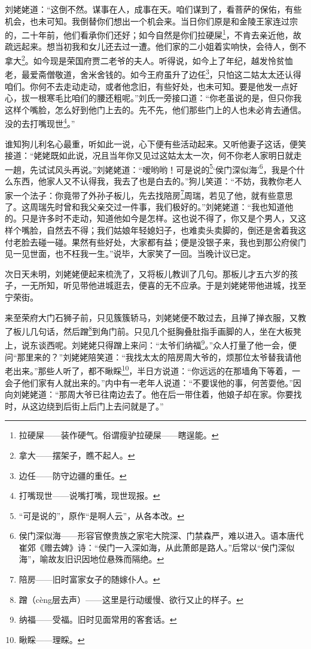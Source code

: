 \par 刘姥姥道：“这倒不然。谋事在人，成事在天。咱们谋到了，看菩萨的保佑，有些机会，也未可知。我倒替你们想出一个机会来。当日你们原是和金陵王家连过宗的，二十年前，他们看承你们还好；如今自然是你们拉硬屎\footnote{拉硬屎——装作硬气。俗谓瘦驴拉硬屎——瞎逞能。}，不肯去亲近他，故疏远起来。想当初我和女儿还去过一遭。他们家的二小姐着实响快，会待人，倒不拿大\footnote{拿大——摆架子，瞧不起人。}。如今现是荣国府贾二老爷的夫人。听得说，如今上了年纪，越发怜贫恤老，最爱斋僧敬道，舍米舍钱的。如今王府虽升了边任\footnote{边任——防守边疆的重任。}，只怕这二姑太太还认得咱们。你何不去走动走动，或者他念旧，有些好处，也未可知。要是他发一点好心，拔一根寒毛比咱们的腰还粗呢。”刘氏一旁接口道：“你老虽说的是，但只你我这样个嘴脸，怎么好到他门上去的。先不先，他们那些门上的人也未必肯去通信。没的去打嘴现世\footnote{打嘴现世——说嘴打嘴，现世现报。}。”
\par 谁知狗儿利名心最重，听如此一说，心下便有些活动起来。又听他妻子这话，便笑接道：“姥姥既如此说，况且当年你又见过这姑太太一次，何不你老人家明日就走一趟，先试试风头再说。”刘姥姥道：“嗳哟哟！可是说的\footnote{“可是说的”，原作“是啊人云”，从各本改。}‘侯门深似海’\footnote{侯门深似海——形容官僚贵族之家宅大院深、门禁森严，难以进入。语本唐代崔郊《赠去婢》诗：“侯门一入深如海，从此萧郎是路人。”后常以“侯门深似海”，喻故友旧识因地位悬殊而隔绝。}，我是个什么东西，他家人又不认得我，我去了也是白去的。”狗儿笑道：“不妨，我教你老人家一个法子：你竟带了外孙子板儿，先去找陪房\footnote{陪房——旧时富家女子的随嫁仆人。}周瑞，若见了他，就有些意思了。这周瑞先时曾和我父亲交过一件事，我们极好的。”刘姥姥道：“我也知道他的。只是许多时不走动，知道他如今是怎样。这也说不得了，你又是个男人，又这样个嘴脸，自然去不得；我们姑娘年轻媳妇子，也难卖头卖脚的，倒还是舍着我这付老脸去碰一碰。果然有些好处，大家都有益；便是没银子来，我也到那公府侯门见一见世面，也不枉我一生。”说毕，大家笑了一回。当晚计议已定。
\par 次日天未明，刘姥姥便起来梳洗了，又将板儿教训了几句。那板儿才五六岁的孩子，一无所知，听见带他进城逛去，便喜的无不应承。于是刘姥姥带他进城，找至宁荣街。
\par 来至荣府大门石狮子前，只见簇簇轿马，刘姥姥便不敢过去，且掸了掸衣服，又教了板儿几句话，然后蹭\footnote{蹭（cèng层去声）——这里是行动缓慢、欲行又止的样子。}到角门前。只见几个挺胸叠肚指手画脚的人，坐在大板凳上，说东谈西呢。刘姥姥只得蹭上来问：“太爷们纳福\footnote{纳福——受福。旧时见面常用的客套话。}。”众人打量了他一会，便问“那里来的？”刘姥姥陪笑道：“我找太太的陪房周大爷的，烦那位太爷替我请他老出来。”那些人听了，都不瞅睬\footnote{ 瞅睬——理睬。}，半日方说道：“你远远的在那墙角下等着，一会子他们家有人就出来的。”内中有一老年人说道：“不要误他的事，何苦耍他。”因向刘姥姥道：“那周大爷已往南边去了。他在后一带住着，他娘子却在家。你要找时，从这边绕到后街上后门上去问就是了。”
